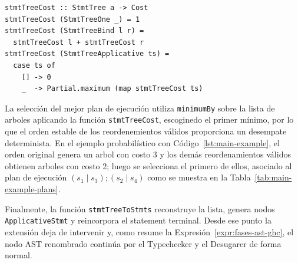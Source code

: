 \begin{lstlisting}[style=haskell,caption={Cálculo del costo estructural de un plan de ejecución.},label={lst:stmt-tree-cost}]
stmtTreeCost :: StmtTree a -> Cost
stmtTreeCost (StmtTreeOne _) = 1
stmtTreeCost (StmtTreeBind l r) =
  stmtTreeCost l + stmtTreeCost r
stmtTreeCost (StmtTreeApplicative ts) =
  case ts of
    [] -> 0
    _  -> Partial.maximum (map stmtTreeCost ts)
\end{lstlisting}

La selección del mejor plan de ejecución utiliza \texttt{minimumBy} sobre la lista de arboles aplicando la función \texttt{stmtTreeCost}, escoginedo el primer mínimo, por lo que el orden estable de los reordenemientos válidos proporciona un desempate determinista. En el ejemplo probabilístico con Código~\ref{lst:main-example}, el orden original genera un arbol con costo 3 y los demás reordenamientos válidos obtienen arboles con costo 2; luego se selecciona el primero de ellos, asociado al plan de ejecución $(s_1\mid s_3);(s_2\mid s_4)$ como se muestra en la Tabla~\ref{tab:main-example-plans}.

Finalmente, la función \texttt{stmtTreeToStmts} reconstruye la lista, genera nodos \texttt{ApplicativeStmt} y reincorpora el statement terminal. Desde ese punto la extensión deja de intervenir y, como resume la Expresión~\ref{expr:fases-ast-ghc}, el nodo AST renombrado continúa por el Typechecker y el Desugarer de forma normal.

